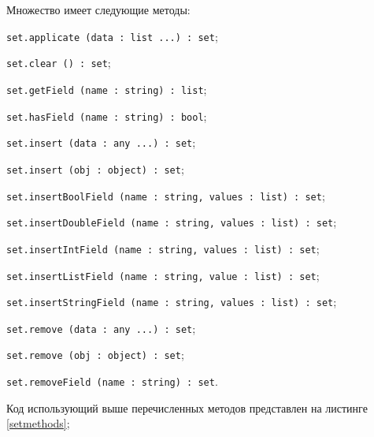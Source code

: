 Множество имеет следующие методы:
\begin{icItems}
\item \lstinline|set.applicate (data : list ...) : set|;
\item \lstinline|set.clear () : set|;
\item \lstinline|set.getField (name : string) : list|;
\item \lstinline|set.hasField (name : string) : bool|;
\item \lstinline|set.insert (data : any ...) : set|;
\item \lstinline|set.insert (obj : object) : set|;
\item \lstinline|set.insertBoolField (name : string, values : list) : set|;
\item \lstinline|set.insertDoubleField (name : string, values : list) : set|;
\item \lstinline|set.insertIntField (name : string, values : list) : set|;
\item \lstinline|set.insertListField (name : string, value : list) : set|;
\item \lstinline|set.insertStringField (name : string, values : list) : set|;
\item \lstinline|set.remove (data : any ...) : set|;
\item \lstinline|set.remove (obj : object) : set|;
\item \lstinline|set.removeField (name : string) : set|.
\end{icItems}

Код использующий выше перечисленных методов представлен на листинге \ref{setmethods};

